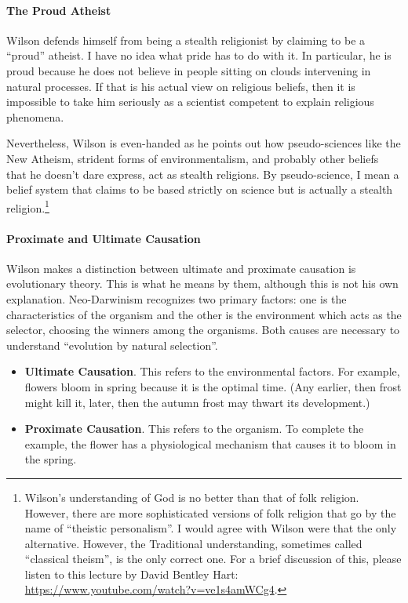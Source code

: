 \paragraph{The Proud Atheist}


Wilson defends himself from being a stealth religionist by claiming to be a ``proud'' atheist. I have no idea what pride has to do with it. In particular, he is proud because he does not believe in people sitting on clouds intervening in natural processes. If that is his actual view on religious beliefs, then it is impossible to take him seriously as a scientist competent to explain religious phenomena.

Nevertheless, Wilson is even-handed as he points out how pseudo-sciences like the New Atheism, strident forms of environmentalism, and probably other beliefs that he doesn't dare express, act as stealth religions. By pseudo-science, I mean a belief system that claims to be based strictly on science but is actually a stealth religion.\footnote{Wilson's understanding of God is no better than that of folk religion. However, there are more sophisticated versions of folk religion that go by the name of ``theistic personalism''. I would agree with Wilson were that the only alternative. However, the Traditional understanding, sometimes called ``classical theism'', is the only correct one. For a brief discussion of this, please listen to this lecture by David Bentley Hart: \url{https://www.youtube.com/watch?v=ve1s4amWCg4}.}

\paragraph{Proximate and Ultimate Causation}


Wilson makes a distinction between ultimate and proximate causation is evolutionary theory. This is what he means by them, although this is not his own explanation. Neo-Darwinism recognizes two primary factors: one is the characteristics of the organism and the other is the environment which acts as the selector, choosing the winners among the organisms. Both causes are necessary to understand ``evolution by natural selection''.

\begin{itemize}


\item \textbf{Ultimate Causation}. This refers to the environmental factors. For example, flowers bloom in spring because it is the optimal time. (Any earlier, then frost might kill it, later, then the autumn frost may thwart its development.)

\item \textbf{Proximate Causation}. This refers to the organism. To complete the example, the flower has a physiological mechanism that causes it to bloom in the spring.
\end{itemize}


